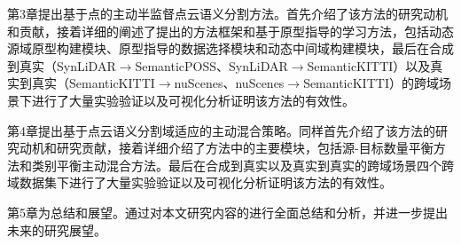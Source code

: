 第3章提出基于点的主动半监督点云语义分割方法。首先介绍了该方法的研究动机和贡献，接着详细的阐述了提出的方法框架和基于原型指导的学习方法，包括动态源域原型构建模块、原型指导的数据选择模块和动态中间域构建模块，最后在合成到真实（SynLiDAR$\to$SemanticPOSS、SynLiDAR$\to$SemanticKITTI）以及真实到真实（SemanticKITTI$\to$nuScenes、nuScenes$\to$SemanticKITTI）的跨域场景下进行了大量实验验证以及可视化分析证明该方法的有效性。

第4章提出基于点云语义分割域适应的主动混合策略。同样首先介绍了该方法的研究动机和研究贡献，接着详细介绍了方法中的主要模块，包括源-目标数量平衡方法和类别平衡主动混合方法。最后在合成到真实以及真实到真实的跨域场景四个跨域数据集下进行了大量实验验证以及可视化分析证明该方法的有效性。

第5章为总结和展望。通过对本文研究内容的进行全面总结和分析，并进一步提出未来的研究展望。

\clearpage
